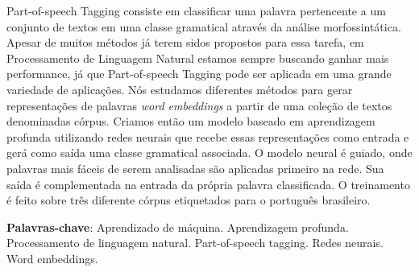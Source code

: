 \begin{resumo}
 
Part-of-speech Tagging consiste em classificar uma palavra pertencente a um conjunto de textos em uma classe gramatical através da análise morfossintática. Apesar de muitos métodos já terem sidos propostos para essa tarefa, em Processamento de Linguagem Natural estamos sempre buscando ganhar mais performance, já que Part-of-speech Tagging pode ser aplicada em uma grande variedade de aplicações. Nós estudamos diferentes métodos para gerar representações de palavras \textit{word embeddings} a partir de uma coleção de textos denominadas córpus. Criamos então um modelo baseado em aprendizagem profunda utilizando redes neurais que recebe essas representações como entrada e gerá como saída uma classe gramatical associada. O modelo neural é guiado, onde palavras mais fáceis de serem analisadas são aplicadas primeiro na rede. Sua saída é complementada na entrada da própria palavra classificada. O treinamento é feito sobre três diferente córpus etiquetados para o português brasileiro.

 \vspace{\onelineskip}
    
 \noindent
 \textbf{Palavras-chave}: Aprendizado de máquina. Aprendizagem profunda. Processamento de linguagem natural. Part-of-speech tagging. Redes neurais. Word embeddings.
\end{resumo}
